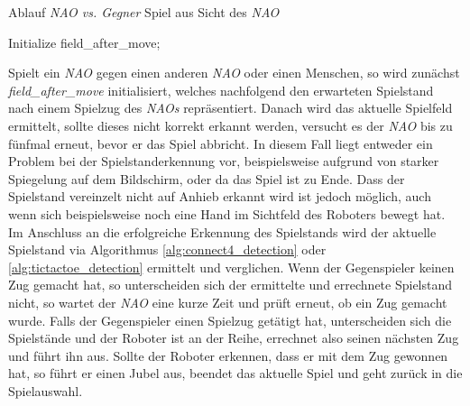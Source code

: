 \begin{algorithm}[H]
    \LinesNumbered
    \SetAlgoLined
    \caption{Ablauf \textit{NAO vs. Gegner} Spiel aus Sicht des \textit{NAO}}\label{alg:game_sequence}
    Initialize field\_after\_move;\\
\end{algorithm}
\vspace{\baselineskip}
Spielt ein \textit{NAO} gegen einen anderen \textit{NAO} oder einen Menschen, so wird zunächst \textit{field\_after\_move} initialisiert, welches nachfolgend den erwarteten Spielstand nach einem Spielzug des \textit{NAOs} repräsentiert. Danach wird das aktuelle Spielfeld ermittelt, sollte dieses nicht korrekt erkannt werden, versucht es der \textit{NAO} bis zu fünfmal erneut, bevor er das Spiel abbricht. In diesem Fall liegt entweder ein Problem bei der Spielstanderkennung vor, beispielsweise aufgrund von starker Spiegelung auf dem Bildschirm, oder da das Spiel ist zu Ende. Dass der Spielstand vereinzelt nicht auf Anhieb erkannt wird ist jedoch möglich, auch wenn sich beispielsweise noch eine Hand im Sichtfeld des Roboters bewegt hat. Im Anschluss an die erfolgreiche Erkennung des Spielstands wird der aktuelle Spielstand via Algorithmus \vref{alg:connect4_detection} oder \vref{alg:tictactoe_detection} ermittelt und verglichen. Wenn der Gegenspieler keinen Zug gemacht hat, so unterscheiden sich der ermittelte und errechnete Spielstand nicht, so wartet der \textit{NAO} eine kurze Zeit und prüft erneut, ob ein Zug gemacht wurde. Falls der Gegenspieler einen Spielzug getätigt hat, unterscheiden sich die Spielstände und der Roboter ist an der Reihe, errechnet also seinen nächsten Zug und führt ihn aus. Sollte der Roboter erkennen, dass er mit dem Zug gewonnen hat, so führt er einen Jubel aus, beendet das aktuelle Spiel und geht zurück in die Spielauswahl.\\

